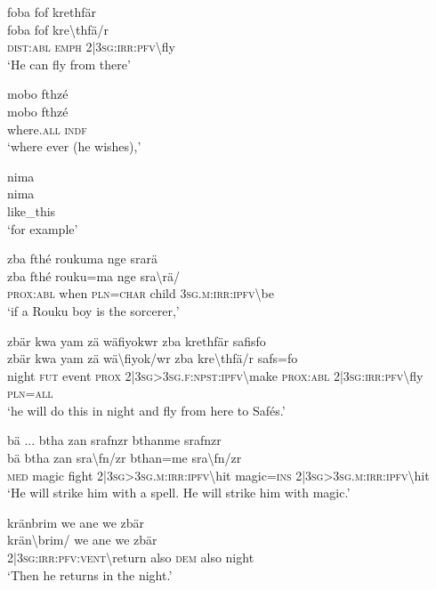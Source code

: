 \ea\label{ex:a4352}
foba fof krethfär\\
\gll foba	fof	kre{\textbackslash}thfä/r\\
     \textsc{dist}:\textsc{abl}	\textsc{emph}	2|3\textsc{sg}:\textsc{irr}:\textsc{pfv}{\textbackslash}fly\\
\glt `He can fly from there'
\z

\ea\label{ex:a4353}
mobo fthzé\\
\gll mobo	fthzé\\
     where.\textsc{all}	\textsc{indf}\\
\glt `where ever (he wishes),'
\z

\ea\label{ex:a4354}
nima\\
\gll nima\\
     like\_this\\
\glt `for example'
\z

\ea\label{ex:a4355}
zba fthé roukuma nge srarä\\
\gll zba	fthé	rouku=ma	nge	sra{\textbackslash}rä/\\
     \textsc{prox}:\textsc{abl}	when	\textsc{pln}=\textsc{char}	child	3\textsc{sg}.\textsc{m}:\textsc{irr}:\textsc{ipfv}{\textbackslash}be\\
\glt `if a Rouku boy is the sorcerer,'
\z

\ea\label{ex:a4356}
zbär kwa yam zä wäfiyokwr zba krethfär safisfo\\
\gll zbär	kwa	yam	zä	wä{\textbackslash}fiyok/wr	zba	kre{\textbackslash}thfä/r	safs=fo\\
     night	\textsc{fut}	event	\textsc{prox}	2|3\textsc{sg}>3\textsc{sg}.\textsc{f}:\textsc{npst}:\textsc{ipfv}{\textbackslash}make	\textsc{prox}:\textsc{abl}	2|3\textsc{sg}:\textsc{irr}:\textsc{pfv}{\textbackslash}fly	\textsc{pln}=\textsc{all}\\
\glt `he will do this in night and fly from here to Safés.'
\z

\ea\label{ex:a4357}
bä ... btha zan srafnzr bthanme srafnzr\\
\gll bä	btha	zan	sra{\textbackslash}fn/zr	bthan=me	sra{\textbackslash}fn/zr\\
     \textsc{med}	magic	fight	2|3\textsc{sg}>3\textsc{sg}.\textsc{m}:\textsc{irr}:\textsc{ipfv}{\textbackslash}hit	magic=\textsc{ins}	2|3\textsc{sg}>3\textsc{sg}.\textsc{m}:\textsc{irr}:\textsc{ipfv}{\textbackslash}hit\\
\glt `He will strike him with a spell. He will strike him with magic.'
\z

\ea\label{ex:a4359}
kränbrim we ane we zbär\\
\gll krän{\textbackslash}brim/	we	ane	we	zbär\\
     2|3\textsc{sg}:\textsc{irr}:\textsc{pfv}:\textsc{vent}{\textbackslash}return	also	\textsc{dem}	also	night\\
\glt `Then he returns in the night.'
\z


